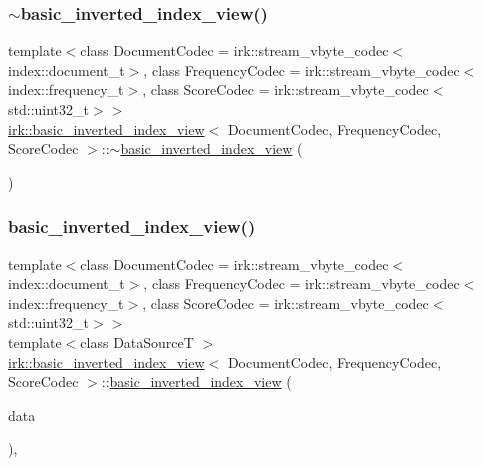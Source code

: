 \subsubsection{\texorpdfstring{$\sim$basic\+\_\+inverted\+\_\+index\+\_\+view()}{~basic\_inverted\_index\_view()}}
{\footnotesize\ttfamily template$<$class Document\+Codec  = irk\+::stream\+\_\+vbyte\+\_\+codec$<$index\+::document\+\_\+t$>$, class Frequency\+Codec  = irk\+::stream\+\_\+vbyte\+\_\+codec$<$index\+::frequency\+\_\+t$>$, class Score\+Codec  = irk\+::stream\+\_\+vbyte\+\_\+codec$<$std\+::uint32\+\_\+t$>$$>$ \\
\mbox{\hyperlink{classirk_1_1basic__inverted__index__view}{irk\+::basic\+\_\+inverted\+\_\+index\+\_\+view}}$<$ Document\+Codec, Frequency\+Codec, Score\+Codec $>$\+::$\sim$\mbox{\hyperlink{classirk_1_1basic__inverted__index__view}{basic\+\_\+inverted\+\_\+index\+\_\+view}} (\begin{DoxyParamCaption}{ }\end{DoxyParamCaption})\hspace{0.3cm}{\ttfamily [default]}}

\mbox{\label{classirk_1_1basic__inverted__index__view_a84a35a3338c4c00bd80345a1ddfdd342}} 
\subsubsection{\texorpdfstring{basic\+\_\+inverted\+\_\+index\+\_\+view()}{basic\_inverted\_index\_view()}\hspace{0.1cm}{\footnotesize\ttfamily [4/4]}}
{\footnotesize\ttfamily template$<$class Document\+Codec  = irk\+::stream\+\_\+vbyte\+\_\+codec$<$index\+::document\+\_\+t$>$, class Frequency\+Codec  = irk\+::stream\+\_\+vbyte\+\_\+codec$<$index\+::frequency\+\_\+t$>$, class Score\+Codec  = irk\+::stream\+\_\+vbyte\+\_\+codec$<$std\+::uint32\+\_\+t$>$$>$ \\
template$<$class Data\+SourceT $>$ \\
\mbox{\hyperlink{classirk_1_1basic__inverted__index__view}{irk\+::basic\+\_\+inverted\+\_\+index\+\_\+view}}$<$ Document\+Codec, Frequency\+Codec, Score\+Codec $>$\+::\mbox{\hyperlink{classirk_1_1basic__inverted__index__view}{basic\+\_\+inverted\+\_\+index\+\_\+view}} (\begin{DoxyParamCaption}\item[{Data\+SourceT $\ast$}]{data }\end{DoxyParamCaption})\hspace{0.3cm}{\ttfamily [inline]}, {\ttfamily [explicit]}}



